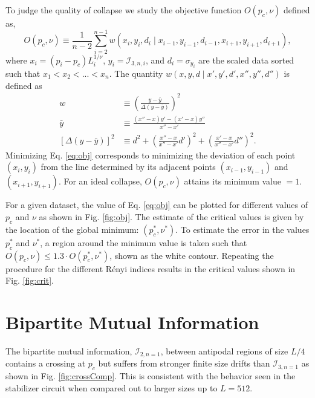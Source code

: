 \documentclass[prl,twocolumn,aps,showpacs,amsmath,amssymb,superscriptaddress,floatfix,longbibliography]{revtex4-1}
\begin{document}
To judge the quality of collapse we study the objective function $O(p_c,\nu)$ defined as,
\begin{equation}
O(p_c,\nu) \equiv \frac{1}{n-2}\sum_{i=2}^{n-1}w(x_i,y_i,d_i\mid x_{i-1},y_{i-1},d_{i-1},x_{i+1},y_{i+1},d_{i+1}),
\label{eq:obj}
\end{equation}
where $x_i = (p_i - p_c)L_i^{1/\nu}$, $y_i = \mathcal{I}_{3,n,i}$, and $d_i = \sigma_{y_i}$ are the scaled data sorted such that $x_1 < x_2 < ... < x_n$. The quantity $w(x,y,d \mid x',y',d',x'',y'',d'')$ is defined as
\begin{align}
w &\equiv \left(\frac{y - \bar{y}}{\Delta(y-\bar{y})}\right)^2 \\
\bar{y} &\equiv \frac{(x''- x)y' - (x'-x)y''}{x''-x'} \\
\left[\Delta(y-\bar{y})\right]^2 &\equiv d^2 + \left( \frac{x''-x}{x''-x'}d'\right)^2 + \left( \frac{x'-x}{x''-x'}d''\right)^2.
\end{align}
Minimizing Eq. \ref{eq:obj} corresponds to minimizing the deviation of each point $(x_i,y_i)$ from the line determined by its adjacent points $(x_{i-1},y_{i-1})$ and $(x_{i+1},y_{i+1})$. For an ideal collapse, $O(p_c,\nu)$ attains its minimum value $=1$. 

For a given dataset, the value of Eq. \ref{eq:obj} can be plotted for different values of $p_c$ and $\nu$ as shown in Fig. \ref{fig:obj}. The estimate of the critical values is given by the location of the global minimum: $(p_c^*,\nu^*)$. To estimate the error in the values  $p_c^*$ and $\nu^*$, a region around the minimum value is taken such that $O(p_c,\nu) \leq 1.3\cdot O(p_c^*,\nu^*)$, shown as the white contour. Repeating the procedure for the different R\'enyi indices results in the critical values shown in Fig. \ref{fig:crit}.




\section{Bipartite Mutual Information}
The bipartite mutual information, $\mathcal{I}_{2,n=1}$, between antipodal regions of size $L/4$ contains a crossing at $p_c$ but suffers from stronger finite size drifts than $\mathcal{I}_{3,n=1}$ as shown in Fig. \ref{fig:crossComp}. This is consistent with the behavior seen in the stabilizer circuit when compared out to larger sizes up to $L=512$.
\end{document}
